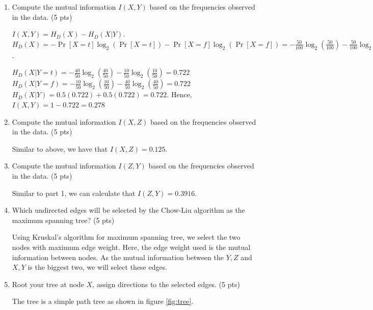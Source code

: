 \documentclass[a4paper]{article}
\theoremstyle{definition}
\newenvironment{soln}{
	\leavevmode\color{blue}\ignorespaces
}{}
\begin{document}
\begin{enumerate}
	\item Compute the mutual information $I(X, Y)$ based on the frequencies observed in the data. (5 pts) \\
    \begin{soln}
        $I(X, Y) = H_D(X) - H_D(X | Y)$.\\
        $H_D (X) = -\Pr[X = t] \log_2(\Pr[X = t]) - \Pr[X = f] \log_2 (\Pr [X = f]) = - \frac{50}{100} \log_2 \left( \frac{50}{100} \right) - \frac{50}{100} \log_2 \left( \frac{50}{100} \right) = 1$.

        $H_D(X | Y = t) = - \frac{40}{50} \log_2 \left( \frac{40}{50} \right) - \frac{10}{50} \log_2 \left( \frac{10}{50} \right) = 0.722$ \\
        $H_D(X | Y = f) = - \frac{10}{50} \log_2 \left( \frac{10}{50} \right) - \frac{40}{50} \log_2 \left( \frac{40}{50} \right) = 0.722$ \\

        $H_D(X | Y) = 0.5 (0.722) + 0.5 (0.722) = 0.722$. Hence, $I(X, Y) = 1 - 0.722 = \mathbf{0.278}$
        
    \end{soln}
	\item Compute the mutual information $I(X, Z)$ based on the frequencies observed in the data. (5 pts) \\
    \begin{soln}
        Similar to above, we have that $I(X, Z) = \mathbf{0.125}$.
    \end{soln}
	\item Compute the mutual information $I(Z, Y)$ based on the frequencies observed in the data. (5 pts) \\
    \begin{soln}
        Similar to part 1, we can calculate that $I(Z, Y) = \mathbf{0.3916}$.
    \end{soln}
	\item Which undirected edges will be selected by the Chow-Liu algorithm as the maximum spanning tree? (5 pts) \\
    \begin{soln}
        Using Kruskal's algorithm for maximum spanning tree, we select the two nodes with maximum edge weight. Here, the edge weight used is the mutual information between nodes. As the mutual information between the $Y, Z$ and $X, Y$ is the biggest two, we will select these edges.
    \end{soln}
	\item Root your tree at node $X$, assign directions to the selected edges. (5 pts) \\
    \begin{soln}
        The tree is a simple path tree as shown in figure \ref{fig:tree}.
        \begin{figure}[h]
            \centering
\end{figure}
\end{soln}
\end{enumerate}
\end{document}
